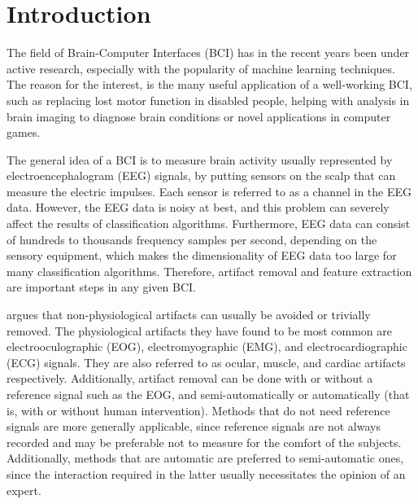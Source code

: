 \section{Introduction}\label{sec:introduction}
The field of Brain-Computer Interfaces (BCI) has in the recent years been under active research, especially with the popularity of machine learning techniques. The reason for the interest, is the many useful application of a well-working BCI, such as replacing lost motor function in disabled people, helping with analysis in brain imaging to diagnose brain conditions or novel applications in computer games. 

The general idea of a BCI is to measure brain activity usually represented by electroencephalogram (EEG) signals, by putting sensors on the scalp that can measure the electric impulses. Each sensor is referred to as a channel in the EEG data. However, the EEG data is noisy at best, and this problem can severely affect the results of classification algorithms. Furthermore, EEG data can consist of hundreds to thousands frequency samples per second, depending on the sensory equipment, which makes the dimensionality of EEG data too large for many classification algorithms. Therefore, artifact removal and feature extraction are important steps in any given BCI.

\cite{uriguen2015eeg} argues that non-physiological artifacts can usually be avoided or trivially removed. The physiological artifacts they have found to be most common are electrooculographic (EOG), electromyographic (EMG), and electrocardiographic (ECG) signals. They are also referred to as ocular, muscle, and cardiac artifacts respectively. Additionally, artifact removal can be done with or without a reference signal such as the EOG, and semi-automatically or automatically (that is, with or without human intervention). Methods that do not need reference signals are more generally applicable, since reference signals are not always recorded and may be preferable not to measure for the comfort of the subjects. Additionally, methods that are automatic are preferred to semi-automatic ones, since the interaction required in the latter usually necessitates the opinion of an expert.

